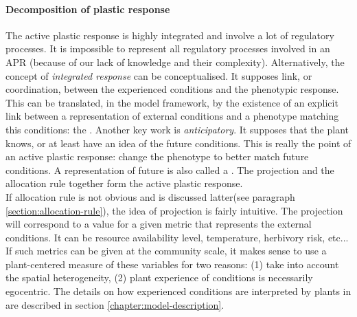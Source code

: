 \paragraph{Decomposition of plastic response}
The active plastic response is highly integrated and involve a lot of regulatory processes. It is impossible to represent all regulatory processes involved in an APR (because of our lack of knowledge and their complexity). Alternatively, the concept of \textit{integrated response} can be conceptualised. It supposes link, or coordination, between the experienced conditions and the phenotypic response. This can be translated, in the model framework, by the existence of an explicit link between a representation of external conditions and a phenotype matching this conditions: the . Another key work is \textit{anticipatory}. It supposes that the plant knows, or at least have an idea of the future conditions. This is really the point of an active plastic response: change the phenotype to better match future conditions. A representation of future is also called a . The projection and the allocation rule together form the active plastic response.\\
If allocation rule is not obvious and is discussed latter(see paragraph \ref{section:allocation-rule}), the idea of projection is fairly intuitive. The projection will correspond to a value for a given metric that represents the external conditions. It can be resource availability level, temperature, herbivory risk, etc... If such metrics can be given at the community scale, it makes sense to use a plant-centered measure of these variables for two reasons: (1) take into account the spatial heterogeneity, (2) plant experience of conditions is necessarily egocentric. The details on how experienced conditions are interpreted by plants in \model are described in section \ref{chapter:model-description}.

